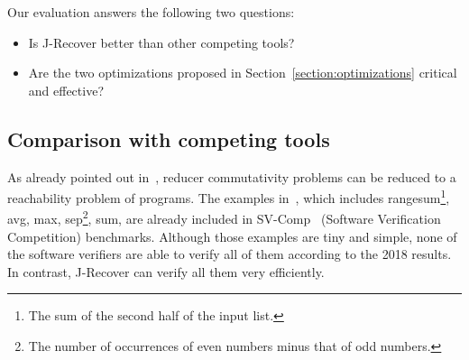 \documentclass{llncs}
\begin{document}
Our evaluation answers the following two questions:
\begin{itemize}
	\item Is J-Recover better than other competing tools?
	\item Are the two optimizations proposed in Section~\ref{section:optimizations} critical and effective?
\end{itemize}

\subsection{Comparison with competing tools}
As already pointed out in~\cite{ChenHSW15}, reducer commutativity problems can be reduced to a reachability problem of programs.
The examples in~\cite{ChenHSW15}, which includes \textsf{rangesum}\footnote{The sum of the second half of the input list.}, \textsf{avg}, \textsf{max}, \textsf{sep}\footnote{The number of occurrences of even numbers minus that of odd numbers.}, \textsf{sum}, are already included in SV-Comp~\cite{svcomp} (Software Verification Competition) benchmarks.
Although those examples are tiny and simple, none of the software verifiers are able to verify all of them according to the 2018 results. In contrast, J-Recover can verify all them very efficiently.
\end{document}
